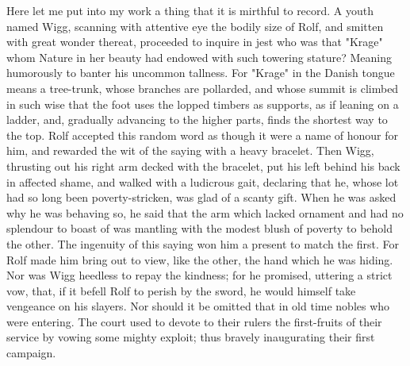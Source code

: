 \documentclass[10pt,a4paper]{report}
\begin{document}
Here let me put into my work a thing that it is mirthful to record. A youth named Wigg, scanning with attentive eye the bodily size of Rolf, and smitten with great wonder thereat, proceeded to inquire in jest who was that "Krage" whom Nature in her beauty had endowed with such towering stature? Meaning humorously to banter his uncommon tallness. For "Krage" in the Danish tongue means a tree-trunk, whose branches are pollarded, and whose summit is climbed in such wise that the foot uses the lopped timbers as supports, as if leaning on a ladder, and, gradually advancing to the higher parts, finds the shortest way to the top. Rolf accepted this random word as though it were a name of honour for him, and rewarded the wit of the saying with a heavy bracelet. Then Wigg, thrusting out his right arm decked with the bracelet, put his left behind his back in affected shame, and walked with a ludicrous gait, declaring that he, whose lot had so long been poverty-stricken, was glad of a scanty gift. When he was asked why he was behaving so, he said that the arm which lacked ornament and had no splendour to boast of was mantling with the modest blush of poverty to behold the other. The ingenuity of this saying won him a present to match the first. For Rolf made him bring out to view, like the other, the hand which he was hiding. Nor was Wigg heedless to repay the kindness; for he promised, uttering a strict vow, that, if it befell Rolf to perish by the sword, he would himself take vengeance on his slayers. Nor should it be omitted that in old time nobles who were entering. The court used to devote to their rulers the first-fruits of their service by vowing some mighty exploit; thus bravely inaugurating their first campaign.\\
\end{document}
